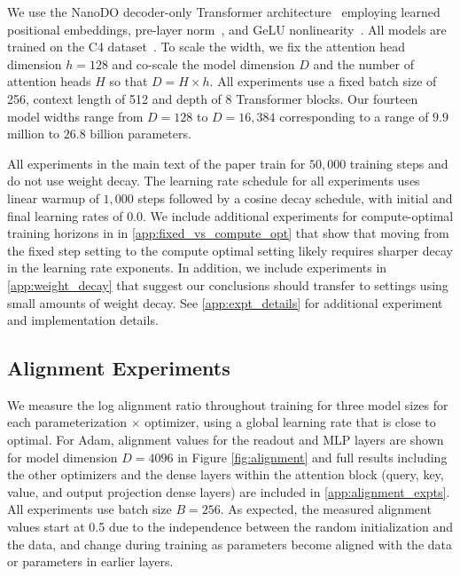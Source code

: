 \documentclass{article}
\theoremstyle{plain}
\theoremstyle{definition}
\theoremstyle{remark}
\begin{document}
We use the NanoDO decoder-only Transformer architecture~\citep{nanodo} employing learned positional embeddings, pre-layer norm~\citep{ba2016layer,xiong2020layer}, and GeLU nonlinearity~\citep{hendrycks2016gaussian}. All models are trained on the C4 dataset~\citep{t5}. To scale the width, we fix the attention head dimension $h = 128$ and co-scale the model dimension $D$ and the number of attention heads $H$ so that $D = H \times h$. All experiments use a fixed batch size of 256, context length of 512 and depth of 8 Transformer blocks. Our fourteen model widths range from $D=128$ to $D=16,384$ corresponding to a range of $9.9$ million to $26.8$ billion parameters.

All experiments in the main text of the paper train for $50{,}000$ training steps and do not use weight decay. The learning rate schedule for all experiments uses linear warmup of $1{,}000$ steps followed by a cosine decay schedule, with initial and final learning rates of $0.0$. We include additional experiments for compute-optimal training horizons in in \cref{app:fixed_vs_compute_opt} that show that moving from the fixed step setting to the compute optimal setting likely requires sharper decay in the learning rate exponents. In addition, we include experiments in \cref{app:weight_decay} that suggest our conclusions should transfer to settings using small amounts of weight decay. See \cref{app:expt_details} for additional experiment and implementation details.





















\subsection{Alignment Experiments}
\label{sec:results_alignment}

We measure the log alignment ratio throughout training for three model sizes for each parameterization $\times$ optimizer, using a global learning rate that is close to optimal. For Adam, alignment values for the readout and MLP layers are shown for model dimension $D = 4096$ in Figure \ref{fig:alignment} and full results including the other optimizers and the dense layers within the attention block (query, key, value, and output projection dense layers) are included in \cref{app:alignment_expts}. All experiments use batch size $B=256$. As expected, the measured alignment values start at 0.5 due to the independence between the random initialization and the data, and change during training as parameters become aligned with the data or parameters in earlier layers.
\end{document}
